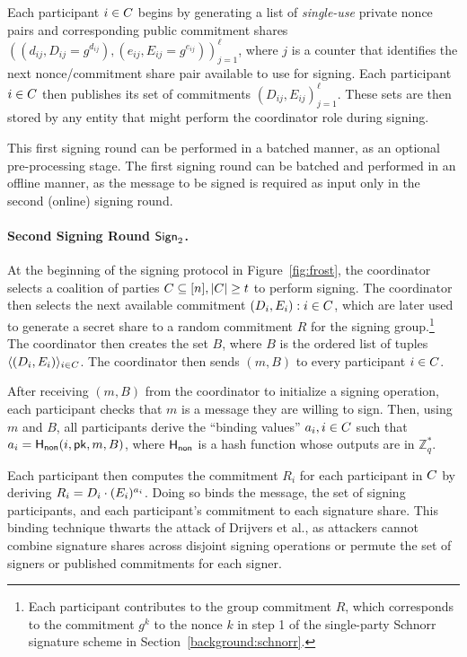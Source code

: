 Each participant $i \in C$ begins by generating a list of
\emph{single-use} private nonce pairs and corresponding public commitment shares
$((d_{ij}, D_{ij} = g^{d_{ij}}), (e_{ij}, E_{ij} = g^{e_{ij}}))_{j=1}^\ell$,
where
$j$ is a counter that identifies the next nonce/commitment share pair available
to use for signing.
Each participant $i \in C$ then publishes its set of commitments
$(D_{ij}, E_{ij} )_{j=1}^\ell$.
These sets are then stored by any entity that might perform
the coordinator role during signing.

This first signing round can be performed in a batched manner,
as an optional pre-processing stage.
The first signing round can be batched and performed in an offline manner,
as the message to be signed is required as input only in the second (online) signing round.

\paragraph{Second Signing Round $\mathsf{Sign}_2$.}
At the beginning of the signing protocol in Figure~\ref{fig:frost},
the coordinator selects  a coalition of parties $C \subseteq [n], \lvert C \rvert \geq t$ to perform signing.
The coordinator then selects the next available commitment
$(D_i, E_i) : i \in C$,
which are later used to generate a secret share to a random commitment $R$ for
the signing group.\footnote{Each participant
contributes to the group commitment $R$, which corresponds to the
commitment $g^k$ to the nonce $k$
in step 1 of the single-party Schnorr signature scheme in
Section~\ref{background:schnorr}.}
%
The coordinator then creates the set $B$, where
$B$ is the ordered list of tuples $\langle(D_i, E_i)\rangle_{i \in C}$.
The coordinator then sends $(m, B)$ to every participant $i \in C$.

After receiving $(m, B)$ from the coordinator to initialize a signing operation,
each participant checks that $m$ is a message they are willing to sign.
Then, using $m$ and $B$,
all participants derive the ``binding values'' $a_i, i \in C$ such that
$a_i = \mathsf{H_{non}}(i, \mathsf{pk}, m, B)$, where $\mathsf{H_{non}}$ is a hash function whose outputs are in $\mathbb{Z}_q^*$.

Each participant then
computes the commitment $R_i$ for each participant in $C$ by
deriving $R_i = D_i \cdot (E_i)^{a_i}$.
Doing so binds the
message, the set of signing participants, and each participant's commitment
to each signature share.
This binding technique thwarts the attack of Drijvers et al.\cite{DrijversEFKLNS19},
as attackers cannot combine signature shares across disjoint signing operations or permute the set of signers or published
commitments for each signer.

